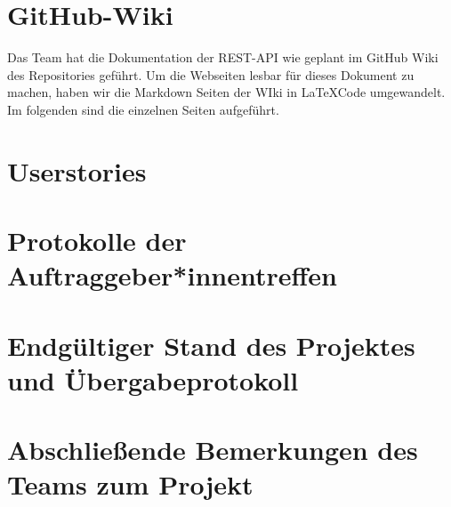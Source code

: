 \documentclass[accentcolor=tud0b,12pt,paper=a4]{tudreport}
\begin{document}
\chapter{GitHub-Wiki}
Das Team hat die Dokumentation der REST-API wie geplant im GitHub Wiki des Repositories geführt. Um die Webseiten lesbar für dieses Dokument zu machen, haben wir die Markdown Seiten der WIki in \LaTeX Code umgewandelt. Im folgenden sind die einzelnen Seiten aufgeführt.













	


\chapter{Userstories}



\chapter{Protokolle der Auftraggeber*innentreffen}

















\chapter{Endgültiger Stand des Projektes und Übergabeprotokoll}

\chapter{Abschließende Bemerkungen des Teams zum Projekt}
\end{document}
